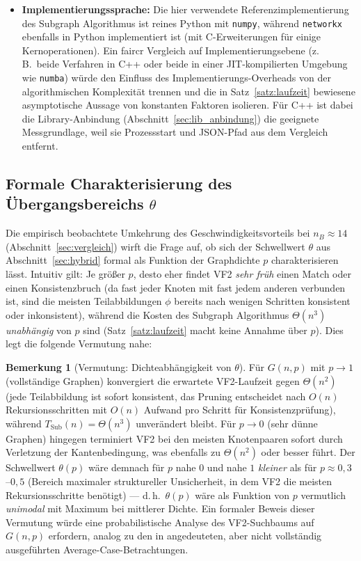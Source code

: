 \documentclass[a4paper,12pt, twoside]{report}
\theoremstyle{definition}
\newtheorem{bemerkung}{Bemerkung}
\begin{document}
\begin{itemize}
	\item \textbf{Implementierungssprache:} Die hier verwendete Referenzimplementierung des Subgraph Algorithmus ist reines Python mit \texttt{numpy}, während \texttt{networkx} ebenfalls in Python implementiert ist (mit C-Erweiterungen für einige Kernoperationen). Ein faircr Vergleich auf Implementierungsebene (z.\,B.\ beide Verfahren in C++ oder beide in einer JIT-kompilierten Umgebung wie \texttt{numba}) würde den Einfluss des Implementierungs-Overheads von der algorithmischen Komplexität trennen und die in Satz~\ref{satz:laufzeit} bewiesene asymptotische Aussage von konstanten Faktoren isolieren. Für C++ ist dabei die Library-Anbindung (Abschnitt~\ref{sec:lib_anbindung}) die geeignete Messgrundlage, weil sie Prozessstart und JSON-Pfad aus dem Vergleich entfernt.
\end{itemize}


\subsection{Formale Charakterisierung des Übergangsbereichs $\theta$}
\label{sec:theta}

Die empirisch beobachtete Umkehrung des Geschwindigkeitsvorteils bei $n_B\approx 14$ (Abschnitt~\ref{sec:vergleich}) wirft die Frage auf, ob sich der Schwellwert $\theta$ aus Abschnitt~\ref{sec:hybrid} formal als Funktion der Graphdichte $p$ charakterisieren lässt. Intuitiv gilt: Je größer $p$, desto eher findet VF2 \emph{sehr früh} einen Match oder einen Konsistenzbruch (da fast jeder Knoten mit fast jedem anderen verbunden ist, sind die meisten Teilabbildungen $\phi$ bereits nach wenigen Schritten konsistent oder inkonsistent), während die Kosten des Subgraph Algorithmus $\Theta(n^3)$ \emph{unabhängig} von $p$ sind (Satz~\ref{satz:laufzeit} macht keine Annahme über $p$). Dies legt die folgende Vermutung nahe:

\begin{bemerkung}[Vermutung: Dichteabhängigkeit von $\theta$]
	\label{bem:theta}
	Für $G(n,p)$ mit $p\to 1$ (vollständige Graphen) konvergiert die erwartete VF2-Laufzeit gegen $\Theta(n^2)$ (jede Teilabbildung ist sofort konsistent, das Pruning entscheidet nach $O(n)$ Rekursionsschritten mit $O(n)$ Aufwand pro Schritt für Konsistenzprüfung), während $T_{\text{Sub}}(n)=\Theta(n^3)$ unverändert bleibt. Für $p\to 0$ (sehr dünne Graphen) hingegen terminiert VF2 bei den meisten Knotenpaaren sofort durch Verletzung der Kantenbedingung, was ebenfalls zu $\Theta(n^2)$ oder besser führt. Der Schwellwert $\theta(p)$ wäre demnach für $p$ nahe $0$ und nahe $1$ \emph{kleiner} als für $p\approx 0{,}3$--$0{,}5$ (Bereich maximaler struktureller Unsicherheit, in dem VF2 die meisten Rekursionsschritte benötigt) — d.\,h.\ $\theta(p)$ wäre als Funktion von $p$ vermutlich \emph{unimodal} mit Maximum bei mittlerer Dichte. Ein formaler Beweis dieser Vermutung würde eine probabilistische Analyse des VF2-Suchbaums auf $G(n,p)$ erfordern, analog zu den in \cite{cordella2004} angedeuteten, aber nicht vollständig ausgeführten Average-Case-Betrachtungen.
\end{bemerkung}
\end{document}
